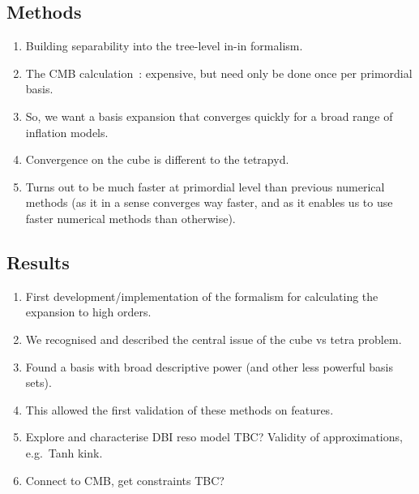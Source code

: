     \subsection{Methods}
    \begin{enumerate}
        \item Building separability into the tree-level in-in formalism.
        \item The CMB calculation~\cite{Sohn_2021}: expensive, but need only be done once per primordial basis.
        \item So, we want a basis expansion that converges quickly for a broad range of inflation models.
        \item Convergence on the cube is different to the tetrapyd.
        \item Turns out to be much faster at primordial level than previous numerical methods
            (as it in a sense converges way faster, and as it enables us to use faster numerical methods than otherwise).
    \end{enumerate}
\newpage
    \subsection{Results}
    \begin{enumerate}
        \item First development/implementation of the formalism for calculating the expansion to high orders.
        \item We recognised and described the central issue of the cube vs tetra problem.
        \item Found a basis with broad descriptive power (and other less powerful basis sets).
        \item This allowed the first validation of these methods on features.
        \item Explore and characterise DBI reso model TBC? Validity of approximations, e.g.\ Tanh kink.
        \item Connect to CMB, get constraints TBC?
    \end{enumerate}
